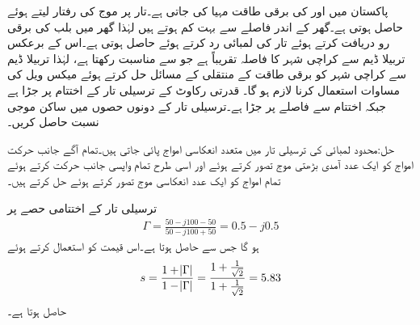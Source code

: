 پاکستان میں  اور  کی برقی طاقت مہیا کی جاتی ہے۔تار پر موج کی رفتار  لیتے ہوئے  حاصل ہوتی ہے۔گھر کے اندر فاصلے  سے بہت کم ہوتے ہیں لہٰذا گھر میں  بلب کی برقی رو دریافت کرتے ہوئے  تار کی لمبائی رد کرتے ہوئے   حاصل ہوتی ہے۔اس کے برعکس تربیلا ڈیم سے کراچی شہر کا فاصلہ تقریباً  ہے جو  سے مناسبت رکھتا ہے، لہٰذا تربیلا ڈیم سے کراچی شہر کو برقی طاقت کے منتقلی کے مسائل حل کرتے ہوئے میکس ویل کی مساوات استعمال کرنا لازم ہو گا۔ 
قدرتی رکاوٹ  کے ترسیلی تار کے اختتام پر  جڑا ہے جبکہ اختتام سے  فاصلے پر   جڑا ہے۔ترسیلی تار کے دونوں حصوں میں ساکن موجی نسبت  حاصل کریں۔

حل:محدود لمبائی کی ترسیلی تار میں متعدد انعکاسی امواج پائی جاتی ہیں۔تمام آگے جانب حرکت امواج کو ایک عدد آمدی بڑھتی موج تصور کرتے ہوئے اور اسی طرح تمام واپسی جانب حرکت کرتے ہوئے تمام امواج کو ایک عدد انعکاسی موج تصور کرتے ہوئے حل کرتے ہیں۔

ترسیلی تار کے اختتامی حصے پر
\begin{align*}
\Gamma=\frac{50-j100-50}{50-j100+50}=0.5-j0.5 
\end{align*}
ہو گا جس سے   حاصل ہوتا ہے۔اس قیمت کو استعمال کرتے ہوئے
\begin{align*}
s=\frac{1+\abs{\Gamma}}{1-\abs{\Gamma}}=\frac{1+\frac{1}{\sqrt{2}}}{1+\frac{1}{\sqrt{2}}}=5.83
\end{align*}
حاصل ہوتا ہے۔

